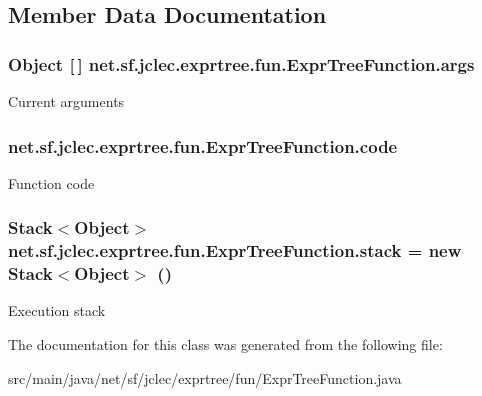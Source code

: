 \subsection{Member Data Documentation}
\hypertarget{classnet_1_1sf_1_1jclec_1_1exprtree_1_1fun_1_1_expr_tree_function_af323c93fc6b862090d0b97f2c774443a}{
\subsubsection[{args}]{\setlength{\rightskip}{0pt plus 5cm}Object \mbox{[}$\,$\mbox{]} net.\-sf.\-jclec.\-exprtree.\-fun.\-Expr\-Tree\-Function.\-args\hspace{0.3cm}{\ttfamily [protected]}}}\label{classnet_1_1sf_1_1jclec_1_1exprtree_1_1fun_1_1_expr_tree_function_af323c93fc6b862090d0b97f2c774443a}
Current arguments \hypertarget{classnet_1_1sf_1_1jclec_1_1exprtree_1_1fun_1_1_expr_tree_function_a148bc528b69b2c629888767cc5e9adbc}{
\subsubsection[{code}]{ net.\-sf.\-jclec.\-exprtree.\-fun.\-Expr\-Tree\-Function.\-code\hspace{0.3cm}{\ttfamily [protected]}}}\label{classnet_1_1sf_1_1jclec_1_1exprtree_1_1fun_1_1_expr_tree_function_a148bc528b69b2c629888767cc5e9adbc}
Function code \hypertarget{classnet_1_1sf_1_1jclec_1_1exprtree_1_1fun_1_1_expr_tree_function_aa023e2e693295e66c955ccdff8069274}{
\subsubsection[{stack}]{\setlength{\rightskip}{0pt plus 5cm}Stack$<$Object$>$ net.\-sf.\-jclec.\-exprtree.\-fun.\-Expr\-Tree\-Function.\-stack = new Stack$<$Object$>$ ()\hspace{0.3cm}{\ttfamily [protected]}}}\label{classnet_1_1sf_1_1jclec_1_1exprtree_1_1fun_1_1_expr_tree_function_aa023e2e693295e66c955ccdff8069274}
Execution stack 

The documentation for this class was generated from the following file\-:\begin{DoxyCompactItemize}
\item 
src/main/java/net/sf/jclec/exprtree/fun/Expr\-Tree\-Function.\-java\end{DoxyCompactItemize}

